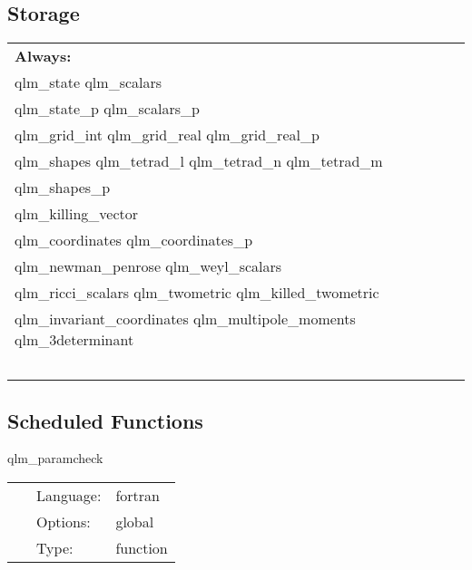 \subsection*{Storage}

\hspace{5mm}

 \begin{tabular*}{160mm}{ll} 

{\bf Always:}&  ~ \\ 
 qlm\_state qlm\_scalars & ~\\ 
 qlm\_state\_p qlm\_scalars\_p & ~\\ 
 qlm\_grid\_int qlm\_grid\_real qlm\_grid\_real\_p & ~\\ 
 qlm\_shapes qlm\_tetrad\_l qlm\_tetrad\_n qlm\_tetrad\_m & ~\\ 
 qlm\_shapes\_p & ~\\ 
 qlm\_killing\_vector & ~\\ 
 qlm\_coordinates qlm\_coordinates\_p & ~\\ 
 qlm\_newman\_penrose qlm\_weyl\_scalars & ~\\ 
 qlm\_ricci\_scalars qlm\_twometric qlm\_killed\_twometric & ~\\ 
 qlm\_invariant\_coordinates qlm\_multipole\_moments qlm\_3determinant & ~\\ 
~ & ~\\ 
\end{tabular*} 


\subsection*{Scheduled Functions}
\vspace{5mm}


\hspace{5mm} qlm\_paramcheck 

\hspace{5mm}{\it check quasi-local parameter settings } 


\hspace{5mm}

 \begin{tabular*}{160mm}{cll} 
~ & Language:  & fortran \\ 
~ & Options:  & global \\ 
~ & Type:  & function \\ 
\end{tabular*} 


\vspace{5mm}

